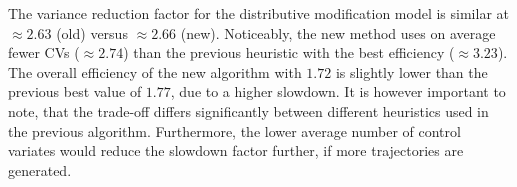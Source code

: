 The variance reduction factor for the distributive modification model
is similar at $\approx 2.63$ (old) versus $\approx 2.66$ (new).
Noticeably, the new method uses on average fewer CVs ($\approx 2.74$)
than the previous heuristic with the best efficiency ($\approx 3.23$).
The overall efficiency of the new algorithm with $1.72$ is slightly
lower than the previous best value of $1.77$, due to a higher slowdown.
It is however important to note, that the trade-off differs
significantly between different  heuristics used in the previous algorithm.
Furthermore, the lower average number of control variates would
reduce the slowdown factor further, if more trajectories are generated.
